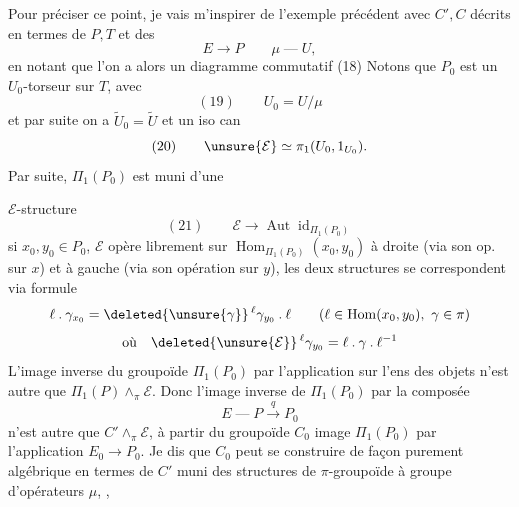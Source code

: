 Pour préciser ce point, je vais m'inspirer
de l'exemple précédent avec $C',C$
décrits en termes de $P,T$ et des
\[
E\longrightarrow P
\qquad
\mu\mathbin{\text{---}}U,
\]
en notant que l'on a alors un diagramme
commutatif
\quad(18)
Notons que  $P_0$ est un $U_0$-torseur sur $T$,
avec
\[
(19)\qquad U_0=U/\mu
\]
et par suite on a $\widetilde U_0=\widetilde U$ et un iso can
\[
(20)\qquad \unsure{\mathcal E}\simeq\pi_1(U_0,1_{U_0}).
\]
Par suite,  $\Pi_1(P_0)$ est muni d'une

$\mathcal E$-structure
\[
(21)\qquad \mathcal E\longrightarrow\operatorname{Aut}\operatorname{id}_{\Pi_1(P_0)}
\]
 si $x_0,y_0\in P_0$, $\mathcal E$ opère librement sur
$\operatorname{Hom}_{\Pi_1(P_0)}(x_0,y_0)$ à droite (via son op. sur $x$) et à
gauche (via son opération sur $y$), les deux
structures  se correspondent via 
 formule
\[
\ell\mathbin{.}\gamma_{x_0}=\deleted{\unsure{\gamma}}\,{}^\ell\gamma_{y_0}\mathbin{.}\ell
\qquad(\ell\in\operatorname{Hom}(x_0,y_0),\ \gamma\in\pi)
\]
\[
\text{où}\quad \deleted{\unsure{\mathcal E}}\,{}^\ell\gamma_{y_0}=\ell\mathbin{.}\gamma\mathbin{.}\ell^{-1}
\]
L'image inverse du groupoïde $\Pi_1(P_0)$
par l'application   sur l'ens des objets
n'est autre que $\Pi_1(P)\mathbin{\wedge}_{\pi}\mathcal E$. Donc
l'image inverse de $\Pi_1(P_0)$ par la composée
\[
E\mathbin{\text{---}}P\mathbin{\xrightarrow{q}}P_0
\]
n'est autre que
$C'\mathbin{\wedge}_{\pi}\mathcal E$,
 à partir du groupoïde $C_0$ image
 $\Pi_1(P_0)$ par l'application
 $E_0\longrightarrow P_0$. Je
dis que  $C_0$ peut se construire de
façon purement algébrique en termes de
$C'$ muni des structures de $\pi$-groupoïde à
groupe d'opérateurs $\mu$, , 

